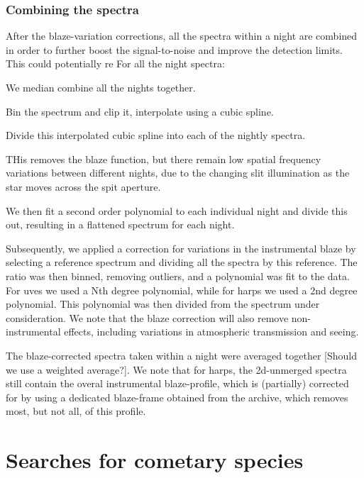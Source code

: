 \documentclass{aa}
\begin{document}
%


\subsubsection{Combining the spectra}
After the blaze-variation corrections, all the spectra within a night are combined in order to further boost the signal-to-noise and improve the detection limits. This could potentially re
 For all the night spectra:

 We median combine all the nights together.

 Bin the spectrum and clip it, interpolate using a cubic spline.


 Divide this interpolated cubic spline into each of the nightly spectra.


THis removes the blaze function, but there remain low spatial frequency variations between different nights, due to the changing slit illumination as the star moves across the spit aperture.

We then fit a second order polynomial to each individual night and divide this out, resulting in a flattened spectrum for each night.


Subsequently, we applied a correction for variations in the instrumental blaze by selecting a reference spectrum and dividing all the spectra by this reference. The ratio was then binned, removing outliers, and a polynomial was fit to the data.
%
For \ac{uves} we used a Nth degree polynomial, while for \ac{harps} we used a 2nd degree polynomial.
%
This polynomial was then divided from the spectrum under consideration. We note that the blaze correction will also remove non-instrumental effects, including variations in atmospheric transmission and seeing.

The blaze-corrected spectra taken within a night were averaged together [Should we use a weighted average?].
%
We note that for \ac{harps}, the 2d-unmerged spectra still contain the overal instrumental blaze-profile, which is (partially) corrected for by using a dedicated blaze-frame obtained from the archive, which removes most, but not all, of this profile. 

\section{Searches for cometary species}
\end{document}
